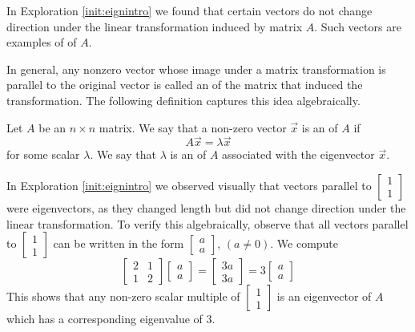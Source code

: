 \documentclass{ximera}
\begin{document}
In Exploration \ref{init:eignintro} we found that certain vectors do not change direction under the linear transformation induced by matrix $A$.  Such vectors are examples of  of $A$. 

In general, any nonzero vector whose image under a matrix transformation is parallel to the original vector is called an  of the matrix that induced the transformation.  The following definition captures this idea algebraically.

\begin{definition}\label{def:eigen}
Let $A$ be an $n \times n$ matrix.  We say that a non-zero vector $\vec{x}$ is an  of $A$ if $$A\vec{x} = \lambda \vec{x}$$
for some scalar $\lambda$.
We say that $\lambda$ is an  of $A$ associated with the eigenvector $\vec{x}$. %
\end{definition}

In Exploration \ref{init:eignintro} we observed visually that vectors parallel to $\begin{bmatrix} 1\\ 1 \end{bmatrix}$ were eigenvectors, as they changed length but did not change direction under the linear transformation.  To verify this algebraically, observe that all vectors parallel to $\begin{bmatrix} 1\\ 1 \end{bmatrix}$ can be written in the form $\begin{bmatrix} a\\ a \end{bmatrix}$, $(a\neq 0)$.  We compute 
$$\begin{bmatrix} 2& 1\\ 1&2 \end{bmatrix} \begin{bmatrix} a\\ a \end{bmatrix} =
\begin{bmatrix} 3a\\ 3a \end{bmatrix}= 3 \begin{bmatrix} a\\ a \end{bmatrix}$$
This shows that any non-zero scalar multiple of $\begin{bmatrix} 1\\ 1 \end{bmatrix}$ is an eigenvector of $A$ which has a corresponding eigenvalue of 3.
\end{document}
